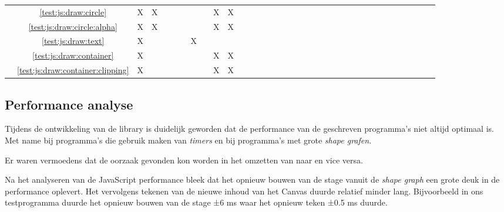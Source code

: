 {\begin{tabular}{cc|c|c|c|c|c|c|c|c|c|c|c|c|c|c|c|c|c|c|c|c|c|c|c|c|c|c|c|c|c|c|c|c|c|}
\multicolumn{1}{|c|}{} & \ref{test:js:draw:circle} 									& X & X &   &   &   &   &   & X & X &   &   &   &   &   &   &   &   &   &   &   &   &   &   &   &   &   &		 \\ \cline{2-29}
\multicolumn{1}{|c|}{} & \ref{test:js:draw:circle:alpha} 							& X & X &   &   &   &   &   & X & X &   &   &   &   &   &   &   &   &   &   &   &   &   &   &   &   &   &		 \\ \cline{2-29}
\multicolumn{1}{|c|}{} & \ref{test:js:draw:text} 									& X &   &   &   &   & X &   &   &   &   &   &   &   &   &   &   &   &   &   &   &   &   &   &   &   &   &		 \\ \cline{2-29}
\multicolumn{1}{|c|}{} & \ref{test:js:draw:container} 								& X &   &   &   &   &   &   & X & X &   &   &   &   &   &   &   &   &   &   &   &   &   &   &   &   &   &		 \\ \cline{2-29}
\multicolumn{1}{|c|}{} & \ref{test:js:draw:container:clipping} 						& X &   &   &   &   &   &   & X & X &   &   &   &   &   &   &   &   &   &   &   &   &   &   &   &   &   &		 \\ \cline{2-29}
\end{tabular}}

\subsection{Performance analyse}
Tijdens de ontwikkeling van de library is duidelijk geworden dat de performance van de geschreven programma's niet altijd optimaal is. Met name bij programma's die gebruik maken van \emph{timers} en bij programma's met grote \emph{shape grafen}.


Er waren vermoedens dat de oorzaak gevonden kon worden in het omzetten van  naar  en vice versa.

Na het analyseren van de JavaScript performance bleek dat het opnieuw bouwen van de stage vanuit de \emph{shape graph} een grote deuk in de performance oplevert. Het vervolgens tekenen van de nieuwe inhoud van het Canvas duurde relatief minder lang. Bijvoorbeeld in ons testprogramma duurde het opnieuw bouwen van de stage ±6 ms waar het opnieuw teken ±0.5 ms duurde.






